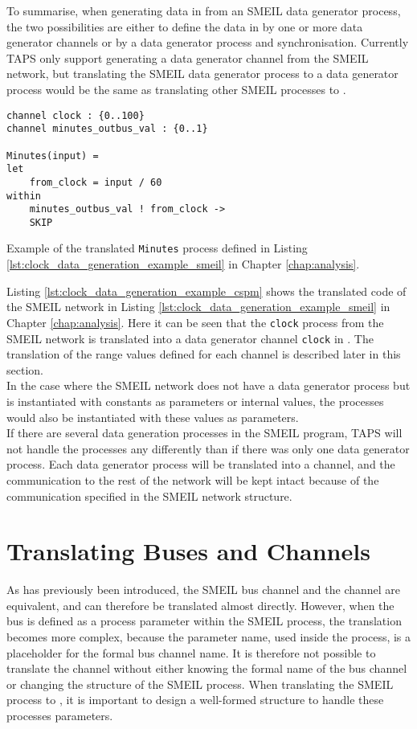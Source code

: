 To summarise, when generating data in \cspm{} from an SMEIL data generator process, the two possibilities are either to define the data in \cspm{} by one or more data generator channels or by a data generator process and synchronisation.
Currently TAPS only support generating a data generator channel from the SMEIL network, but translating the SMEIL data generator process to a \cspm{} data generator process would be the same as translating other SMEIL processes to \cspm{}.
\begin{listing}
\begin{verbatim}
channel clock : {0..100}
channel minutes_outbus_val : {0..1}

Minutes(input) =
let
    from_clock = input / 60
within
    minutes_outbus_val ! from_clock ->
    SKIP

\end{verbatim}
\caption{Example of the translated \texttt{Minutes} process defined in Listing \ref{lst:clock_data_generation_example_smeil} in Chapter \ref{chap:analysis}.}
\label{lst:clock_data_generation_example_cspm}
\end{listing}
Listing \ref{lst:clock_data_generation_example_cspm} shows the translated code of the SMEIL network in Listing \ref{lst:clock_data_generation_example_smeil} in Chapter \ref{chap:analysis}. Here it can be seen that the \texttt{clock} process from the SMEIL network is translated into a data generator channel \texttt{clock} in \cspm{}. The translation of the range values defined for each channel is described later in this section.\\

In the case where the SMEIL network does not have a data generator process but is instantiated with constants as parameters or internal values, the \cspm{} processes would also be instantiated with these values as parameters.\\

If there are several data generation processes in the SMEIL program, TAPS will not handle the processes any differently than if there was only one data generator process. Each data generator process will be translated into a \cspm{} channel, and the communication to the rest of the network will be kept intact because of the communication specified in the SMEIL network structure.

\section{Translating Buses and Channels}
As has previously been introduced, the SMEIL bus channel and the \cspm{} channel are equivalent, and can therefore be translated almost directly. However, when the bus is defined as a process parameter within the SMEIL process, the translation becomes more complex, because the parameter name, used inside the process, is a placeholder for the formal bus channel name. It is therefore not possible to translate the channel without either knowing the formal name of the bus channel or changing the structure of the SMEIL process.
When translating the SMEIL process to \cspm{}, it is important to design a well-formed structure to handle these processes parameters.\\

